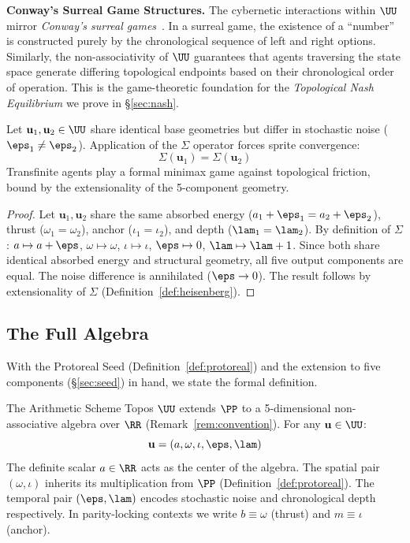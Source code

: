 \textbf{Conway's Surreal Game Structures.} The cybernetic interactions within $\UU$ mirror \emph{Conway's surreal games}~\cite{conway}. In a surreal game, the existence of a ``number'' is constructed purely by the chronological sequence of left and right options. Similarly, the non-associativity of $\UU$ guarantees that agents traversing the state space generate differing topological endpoints based on their chronological order of operation. This is the game-theoretic foundation for the \emph{Topological Nash Equilibrium} we prove in \S\ref{sec:nash}.

\begin{theorem}\label{thm:game-ext}
Let $\mathbf{u}_1, \mathbf{u}_2 \in \UU$ share identical base geometries but differ in stochastic noise ($\eps_1 \neq \eps_2$). Application of the $\Sigma$ operator forces sprite convergence:
$$\Sigma(\mathbf{u}_1) = \Sigma(\mathbf{u}_2)$$
Transfinite agents play a formal minimax game against topological friction, bound by the extensionality of the 5-component geometry.
\end{theorem}

\begin{proof}
Let $\mathbf{u}_1, \mathbf{u}_2$ share the same absorbed energy ($a_1 + \eps_1 = a_2 + \eps_2$), thrust ($\omega_1 = \omega_2$), anchor ($\iota_1 = \iota_2$), and depth ($\lam_1 = \lam_2$). By definition of $\Sigma$: $a \mapsto a + \eps$, $\omega \mapsto \omega$, $\iota \mapsto \iota$, $\eps \mapsto 0$, $\lam \mapsto \lam + 1$. Since both share identical absorbed energy and structural geometry, all five output components are equal. The noise difference is annihilated ($\eps \to 0$). The result follows by extensionality of $\Sigma$ (Definition~\ref{def:heisenberg}). \qedhere
\end{proof}

\subsection{The Full Algebra}

With the Protoreal Seed (Definition~\ref{def:protoreal}) and the extension to five components (\S\ref{sec:seed}) in hand, we state the formal definition.

\begin{definition}\label{def:heisenberg}
The Arithmetic Scheme Topos $\UU$ extends $\PP$ to a 5-dimensional non-associative algebra over $\RR$ (Remark~\ref{rem:convention}). For any $\mathbf{u} \in \UU$:
$$\mathbf{u} = (a, \omega, \iota, \eps, \lam)$$
The definite scalar $a \in \RR$ acts as the center of the algebra. The spatial pair $(\omega, \iota)$ inherits its multiplication from $\PP$ (Definition~\ref{def:protoreal}). The temporal pair $(\eps, \lam)$ encodes stochastic noise and chronological depth respectively. In parity-locking contexts we write $b \equiv \omega$ (thrust) and $m \equiv \iota$ (anchor).
\end{definition}

